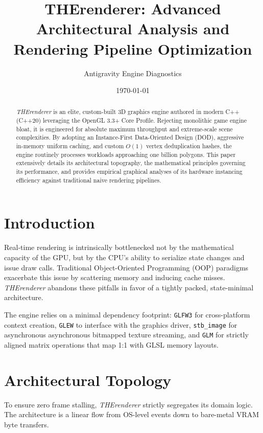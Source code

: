 \documentclass[12pt,a4paper]{article}
\title{\textbf{THErenderer: Advanced Architectural Analysis and Rendering Pipeline Optimization}}
\author{Antigravity Engine Diagnostics}
\date{\today}
\begin{document}
\maketitle

\begin{abstract}
\textit{THErenderer} is an elite, custom-built 3D graphics engine authored in modern C++ (C++20) leveraging the OpenGL 3.3+ Core Profile. Rejecting monolithic game engine bloat, it is engineered for absolute maximum throughput and extreme-scale scene complexities. By adopting an Instance-First Data-Oriented Design (DOD), aggressive in-memory uniform caching, and custom $O(1)$ vertex deduplication hashes, the engine routinely processes workloads approaching one billion polygons. This paper extensively details its architectural topography, the mathematical principles governing its performance, and provides empirical graphical analyses of its hardware instancing efficiency against traditional naive rendering pipelines.
\end{abstract}

\tableofcontents
\newpage

\section{Introduction}
Real-time rendering is intrinsically bottlenecked not by the mathematical capacity of the GPU, but by the CPU's ability to serialize state changes and issue draw calls. Traditional Object-Oriented Programming (OOP) paradigms exacerbate this issue by scattering memory and inducing cache misses. \textit{THErenderer} abandons these pitfalls in favor of a tightly packed, state-minimal architecture.

The engine relies on a minimal dependency footprint: \texttt{GLFW3} for cross-platform context creation, \texttt{GLEW} to interface with the graphics driver, \texttt{stb\_image} for asynchronous asynchronous bitmapped texture streaming, and \texttt{GLM} for strictly aligned matrix operations that map 1:1 with GLSL memory layouts.

\section{Architectural Topology}

To ensure zero frame stalling, \textit{THErenderer} strictly segregates its domain logic. The architecture is a linear flow from OS-level events down to bare-metal VRAM byte transfers.
\end{document}
